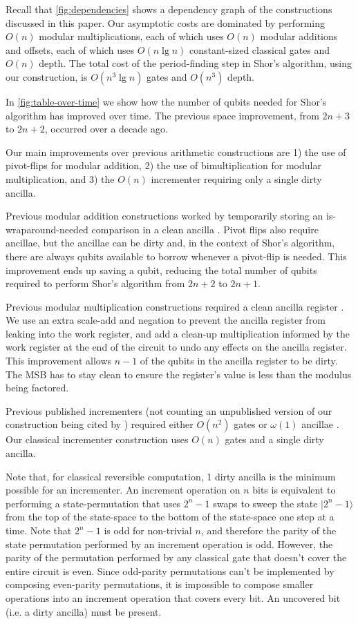 \documentclass[twocolumn,longbibliography]{quantumarticle}
\begin{document}
Recall that \autoref{fig:dependencies} shows a dependency graph of the constructions discussed in this paper.
Our asymptotic costs are dominated by performing $O(n)$ modular multiplications, each of which uses $O(n)$ modular additions and offsets, each of which uses $O(n \lg n)$ constant-sized classical gates \cite{haner2016} and $O(n)$ depth.
The total cost of the period-finding step in Shor's algorithm, using our construction, is $O(n^3 \lg n)$ gates and $O(n^3)$ depth.

In \autoref{fig:table-over-time} we show how the number of qubits needed for Shor's algorithm has improved over time.
The previous space improvement, from $2n+3$ to $2n+2$, occurred over a decade ago.

Our main improvements over previous arithmetic constructions are 1) the use of pivot-flips for modular addition, 2) the use of bimultiplication for modular multiplication, and 3) the $O(n)$ incrementer requiring only a single dirty ancilla.

Previous modular addition constructions worked by temporarily storing an is-wraparound-needed comparison in a clean ancilla \cite{takahashi2006, haner2016}.
Pivot flips also require ancillae, but the ancillae can be dirty and, in the context of Shor's algorithm, there are always qubits available to borrow whenever a pivot-flip is needed.
This improvement ends up saving a qubit, reducing the total number of qubits required to perform Shor's algorithm from $2n+2$ to $2n+1$.

Previous modular multiplication constructions required a clean ancilla register \cite{haner2016}.
We use an extra scale-add and negation to prevent the ancilla register from leaking into the work register, and add a clean-up multiplication informed by the work register at the end of the circuit to undo any effects on the ancilla register.
This improvement allows $n-1$ of the qubits in the ancilla register to be dirty.
The MSB has to stay clean to ensure the register's value is less than the modulus being factored.

Previous published incrementers (not counting an unpublished version of our construction being cited by \cite{haner2016}) required either $O(n^2)$ gates or $\omega(1)$ ancillae \cite{draper2000, barenco1995}.
Our classical incrementer construction uses $O(n)$ gates and a single dirty ancilla.

Note that, for classical reversible computation, 1 dirty ancilla is the minimum possible for an incrementer.
An increment operation on $n$ bits is equivalent to performing a state-permutation that uses $2^n-1$ swaps to sweep the state $|2^n-1\rangle$ from the top of the state-space to the bottom of the state-space one step at a time.
Note that $2^n-1$ is odd for non-trivial $n$, and therefore the parity of the state permutation performed by an increment operation is odd.
However, the parity of the permutation performed by any classical gate that doesn't cover the entire circuit is even.
Since odd-parity permutations can't be implemented by composing even-parity permutations, it is impossible to compose smaller operations into an increment operation that covers every bit.
An uncovered bit (i.e. a dirty ancilla) must be present.
\end{document}
